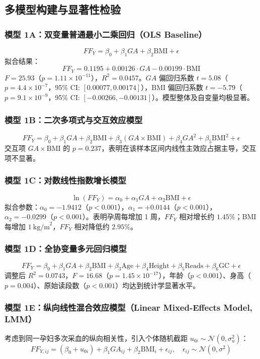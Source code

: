 \documentclass[11pt,a4paper]{article}
\begin{document}
\subsection{多模型构建与显著性检验}

\subsubsection{模型 1A：双变量普通最小二乘回归（OLS Baseline）}
$$FF_Y = \beta_0 + \beta_1 GA + \beta_2 \text{BMI} + \epsilon$$
拟合结果：
$$FF_Y = 0.1195 + 0.00126 \cdot GA - 0.00199 \cdot \text{BMI}$$
$F = 25.93$（$p = 1.11 \times 10^{-11}$），$R^2 = 0.0457$。$GA$ 偏回归系数 $t = 5.08$（$p = 4.4 \times 10^{-7}$，95\% CI: $[0.00077, 0.00174]$），$\text{BMI}$ 偏回归系数 $t = -5.79$（$p = 9.1 \times 10^{-9}$，95\% CI: $[-0.00266, -0.00131]$）。模型整体及自变量均极显著。

\subsubsection{模型 1B：二次多项式与交互效应模型}
$$FF_Y = \beta_0 + \beta_1 GA + \beta_2 \text{BMI} + \beta_3 (GA \times \text{BMI}) + \beta_4 GA^2 + \beta_5 \text{BMI}^2 + \epsilon$$
交互项 $GA \times \text{BMI}$ 的 $p = 0.237$，表明在该样本区间内线性主效应占据主导，交互项不显著。

\subsubsection{模型 1C：对数线性指数增长模型}
$$\ln(FF_Y) = \alpha_0 + \alpha_1 GA + \alpha_2 \text{BMI} + \epsilon$$
拟合参数：$\alpha_0 = -1.9412$（$p < 0.001$），$\alpha_1 = +0.0144$（$p < 0.001$），$\alpha_2 = -0.0299$（$p < 0.001$）。表明孕周每增加 1 周，$FF_Y$ 相对增长约 $1.45\%$；BMI 每增加 $1\ \text{kg/m}^2$，$FF_Y$ 相对降低约 $2.95\%$。

\subsubsection{模型 1D：全协变量多元回归模型}
$$FF_Y = \beta_0 + \beta_1 GA + \beta_2 \text{BMI} + \beta_3 \text{Age} + \beta_4 \text{Height} + \beta_5 \text{Reads} + \beta_6 \text{GC} + \epsilon$$
调整后 $R^2 = 0.0743$，$F = 16.68$（$p = 1.45 \times 10^{-17}$），年龄（$p < 0.001$）、身高（$p = 0.004$）、原始读段数（$p < 0.001$）均达到统计学显著水平。

\subsubsection{模型 1E：纵向线性混合效应模型（Linear Mixed-Effects Model, LMM）}
考虑到同一孕妇多次采血的纵向相关性，引入个体随机截距 $u_{0i} \sim \mathcal{N}(0, \sigma_u^2)$：
$$FF_{Y, ij} = (\beta_0 + u_{0i}) + \beta_1 GA_{ij} + \beta_2 \text{BMI}_i + \epsilon_{ij}, \quad \epsilon_{ij} \sim \mathcal{N}(0, \sigma^2)$$
\end{document}
